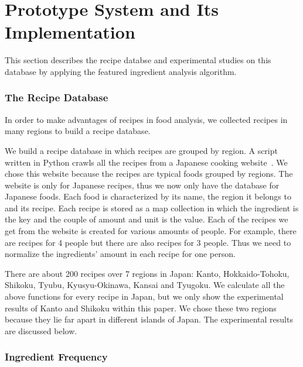 \chapter{Prototype System and Its Implementation}\label{chap:implementation}
This section describes the recipe databse and experimental studies on this database by applying the featured ingredient analysis algorithm.  

\subsection{The Recipe Database}
In order to make advantages of recipes in food analysis, we collected recipes in many regions to build a recipe database. 

We build a recipe database in which recipes are grouped by region. A script written in Python crawls all the recipes from a Japanese cooking website~\cite{web:recipe}. We chose this website because the recipes are typical foods grouped by regions. The website is only for Japanese recipes, thus we now only have the database for Japanese foods. Each food is characterized by its name, the region it belongs to and its recipe. Each recipe is stored as a map collection in which the ingredient is the key and the couple of amount and unit is the value. Each of the recipes we get from the website is created for various amounts of people. For example, there are recipes for 4 people but there are also recipes for 3 people. Thus we need to normalize the ingredients' amount in each recipe for one person.

\par There are about 200 recipes over 7 regions in Japan: Kanto, Hokkaido-Tohoku, Shikoku, Tyubu, Kyusyu-Okinawa, Kansai and Tyugoku. We calculate all the above functions for every recipe in Japan, but we only show the experimental results of Kanto and Shikoku within this paper. We chose these two regions because they lie far apart in different islands of Japan. The experimental results are discussed below. 

\subsection{Ingredient Frequency}

